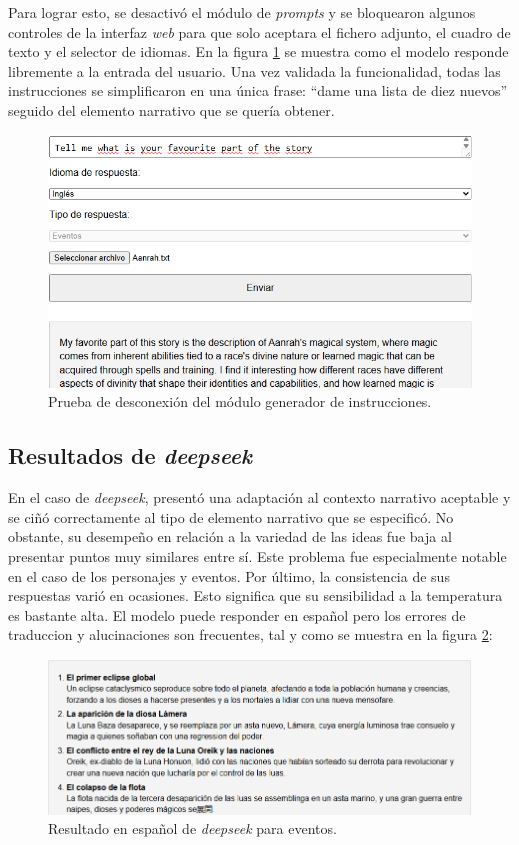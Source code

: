 Para lograr esto, se desactivó el módulo de \textit{prompts} y se bloquearon algunos controles de la interfaz
\textit{web} para que solo aceptara el fichero adjunto, el cuadro de texto y el selector de idiomas.
En la figura \ref{fig:prompt-test} se muestra
como el modelo responde libremente a la entrada del usuario.
Una vez validada la funcionalidad, todas las instrucciones se simplificaron en una única frase:
``dame una lista de diez nuevos'' seguido del elemento narrativo que se quería obtener.
\pagebreak
\begin{figure}[htbp]
	\centering
	\includegraphics[width=1\textwidth]{./Figures/promp-testing.png}
	\caption{Prueba de desconexión del módulo generador de instrucciones.}
	\label{fig:prompt-test}
\end{figure}

\subsection{Resultados de \textit{deepseek}}
En el caso de \textit{deepseek}, presentó una adaptación al contexto narrativo aceptable y se ciñó correctamente al
tipo de elemento narrativo que se especificó.
No obstante, su desempeño en relación a la variedad de las ideas fue baja al presentar puntos muy similares entre sí.
Este problema fue especialmente notable en el caso de los personajes y eventos.
Por último, la consistencia de sus respuestas varió en ocasiones.
Esto significa que su sensibilidad a la temperatura es bastante alta.
El modelo puede responder en español pero los errores de traduccion y alucinaciones son frecuentes,
tal y como se muestra en la figura \ref{fig:deepseek-esp}:

\begin{figure}[htbp]
	\centering
	\includegraphics[width=1\textwidth]{./Figures/deepseek-noprompt-spanish.png}
	\caption{Resultado en español de \textit{deepseek} para eventos.}
	\label{fig:deepseek-esp}
\end{figure}
\pagebreak
